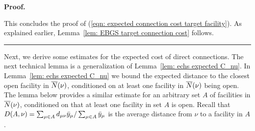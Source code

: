 \documentclass[oneside,final]{ucr}
\newenvironment{proof}[1][Proof]{\textbf{#1.} }{\ \rule{0.5em}{0.5em}}
\begin{document}
\begin{proof}
\begin{description}
\end{description}

This concludes the proof of (\ref{eqn: expected connection
  cost target facility}).  As explained earlier,
Lemma~\ref{lem: EBGS target connection cost} follows.
\end{proof}

Next, we derive some estimates for the expected cost of direct
connections.  The next technical lemma is a generalization of
Lemma~\ref{lem: echs expected C_nu}. In Lemma~\ref{lem: echs expected
  C_nu} we bound the expected distance to the closest open facility in
${\overline{N}}(\nu)$, conditioned on at least one facility in ${\overline{N}}(\nu)$
being open. The lemma below provides a similar estimate for an
arbitrary set $A$ of facilities in ${\overline{N}}(\nu)$, conditioned on that
at least one facility in set $A$ is open.  Recall that $D(A,\nu) =
\sum_{\mu \in A} d_{\mu\nu} {\bar y}_{\mu} / \sum_{\mu \in A}
{\bar y}_{\mu}$ is the average distance from $\nu$ to a facility in $A$. 

\end{document}
